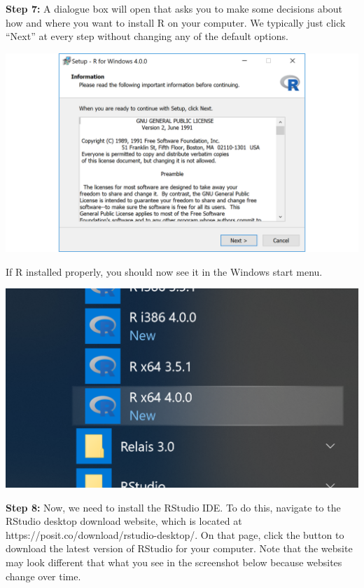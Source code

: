 \documentclass[
  letterpaper,
  DIV=11,
  numbers=noendperiod]{scrreprt}
\begin{document}
\textbf{Step 7:} A dialogue box will open that asks you to make some
decisions about how and where you want to install R on your computer. We
typically just click ``Next'' at every step without changing any of the
default options.

\includegraphics{chapters/installing_r_and_rstudio/pc_install_r2.png}

If R installed properly, you should now see it in the Windows start
menu.

\includegraphics{chapters/installing_r_and_rstudio/pc_view_r.png}

\textbf{Step 8:} Now, we need to install the RStudio IDE. To do this,
navigate to the RStudio desktop download website, which is located at
https://posit.co/download/rstudio-desktop/. On that page, click the
button to download the latest version of RStudio for your computer. Note
that the website may look different that what you see in the screenshot
below because websites change over time.
\end{document}
